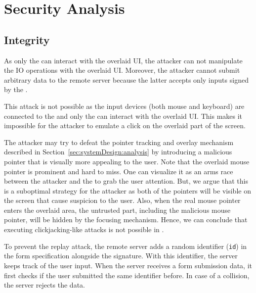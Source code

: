 \section{Security Analysis}
\label{sec:securityAnalysis}




\subsection{Integrity}
\label{sec:securityAnalysis:integrity}


\parasave
{} As only the \device can interact with the overlaid UI, the attacker can not manipulate the IO operations with the overlaid UI. Moreover, the attacker cannot submit arbitrary data to the remote server because the latter accepts only inputs signed by the \device.

\parasave
{} This attack is not possible as the input devices (both mouse and keyboard) are connected to the \device and only the \device can interact with the overlaid UI. This makes it impossible for the attacker to emulate a click on the overlaid part of the screen.  

\parasave
{} 
The attacker may try to defeat the \name pointer tracking and overlay mechanism described in Section~\ref{sec:systemDesign:analysis} by introducing a malicious pointer that is visually more appealing to the user. Note that the \device overlaid mouse pointer is prominent and hard to miss. One can visualize it as an arms race between the attacker and the \device to grab the user attention. But, we argue that this is a suboptimal strategy for the attacker as both of the pointers will be visible on the screen that cause suspicion to the user. Also, when the real mouse pointer enters the overlaid area, the untrusted part, including the malicious mouse pointer, will be hidden by the focusing mechanism. Hence, we can conclude that executing clickjacking-like attacks is not possible in \name.

\parasave
{} %
To prevent the replay attack, the remote server adds a random identifier (\texttt{id}) in the form specification alongside the signature. With this identifier, the server keeps track of the user input. When the server receives a form submission data, it first checks if the user submitted the same identifier before. In case of a collision, the server rejects the data. 


